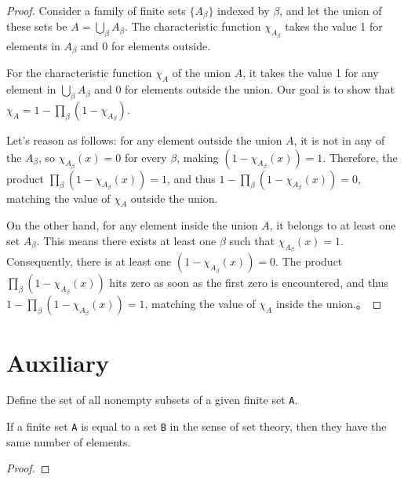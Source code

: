 \begin{proof}
    \leanok

Consider a family of finite sets \(\{A_\beta\}\) indexed by \(\beta\), and let the union of these sets be \(A = \bigcup_\beta A_\beta\). The characteristic function \(\chi_{A_\beta}\) takes the value 1 for elements in \(A_\beta\) and 0 for elements outside.

For the characteristic function \(\chi_A\) of the union \(A\), it takes the value 1 for any element in \(\bigcup_\beta A_\beta\) and 0 for elements outside the union. Our goal is to show that \(\chi_A = 1 - \prod_\beta (1 - \chi_{A_\beta})\).

Let's reason as follows: for any element outside the union \(A\), it is not in any of the \(A_\beta\), so \(\chi_{A_\beta}(x) = 0\) for every \(\beta\), making \((1 - \chi_{A_\beta}(x)) = 1\). Therefore, the product \(\prod_\beta (1 - \chi_{A_\beta}(x)) = 1\), and thus \(1 - \prod_\beta (1 - \chi_{A_\beta}(x)) = 0\), matching the value of \(\chi_A\) outside the union.

On the other hand, for any element inside the union \(A\), it belongs to at least one set \(A_\beta\). This means there exists at least one \(\beta\) such that \(\chi_{A_\beta}(x) = 1\). Consequently, there is at least one \((1 - \chi_{A_\beta}(x)) = 0\). The product \(\prod_\beta (1 - \chi_{A_\beta}(x))\) hits zero as soon as the first zero is encountered, and thus \(1 - \prod_\beta (1 - \chi_{A_\beta}(x)) = 1\), matching the value of \(\chi_A\) inside the union.。

\end{proof}

\section{Auxiliary}

\begin{definition}\label{Finset.powerset₀}
  \leanok
  Define the set of all nonempty subsets of a given finite set \verb|A|.
\end{definition}

\begin{lemma}\label{card_eq}
  \leanok
  If a finite set \verb|A| is equal to a set \verb|B| in the sense of set theory, then they have the same number of elements.
\end{lemma}
\begin{proof}
  \leanok
\end{proof}

